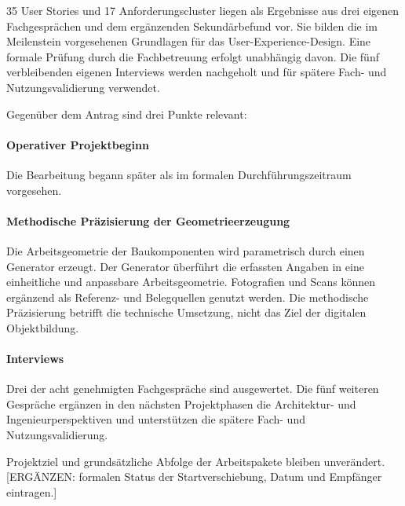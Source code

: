 \documentclass[type=zwischenbericht]{zukunftbau}
\begin{document}
35 User Stories und 17 Anforderungscluster liegen als Ergebnisse aus drei eigenen Fachgesprächen und dem ergänzenden Sekundärbefund vor. Sie bilden die im Meilenstein vorgesehenen Grundlagen für das User-Experience-Design. Eine formale Prüfung durch die Fachbetreuung erfolgt unabhängig davon. Die fünf verbleibenden eigenen Interviews werden nachgeholt und für spätere Fach- und Nutzungsvalidierung verwendet.

Gegenüber dem Antrag sind drei Punkte relevant:

\paragraph{Operativer Projektbeginn}
Die Bearbeitung begann später als im formalen Durchführungszeitraum vorgesehen.

\paragraph{Methodische Präzisierung der Geometrieerzeugung}
Die Arbeitsgeometrie der Baukomponenten wird parametrisch durch einen Generator erzeugt. Der Generator überführt die erfassten Angaben in eine einheitliche und anpassbare Arbeitsgeometrie. Fotografien und Scans können ergänzend als Referenz- und Belegquellen genutzt werden. Die methodische Präzisierung betrifft die technische Umsetzung, nicht das Ziel der digitalen Objektbildung.

\paragraph{Interviews}
Drei der acht genehmigten Fachgespräche sind ausgewertet. Die fünf weiteren Gespräche ergänzen in den nächsten Projektphasen die Architektur- und Ingenieurperspektiven und unterstützen die spätere Fach- und Nutzungsvalidierung.

Projektziel und grundsätzliche Abfolge der Arbeitspakete bleiben unverändert. [ERGÄNZEN: formalen Status der Startverschiebung, Datum und Empfänger eintragen.]
\end{document}
